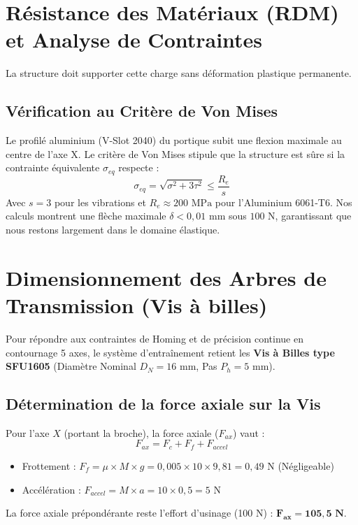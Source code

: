 \section{Résistance des Matériaux (RDM) et Analyse de Contraintes}
La structure doit supporter cette charge sans déformation plastique permanente.

\subsection{Vérification au Critère de Von Mises}
Le profilé aluminium (V-Slot 2040) du portique subit une flexion maximale au centre de l'axe X. Le critère de Von Mises stipule que la structure est sûre si la contrainte équivalente $\sigma_{eq}$ respecte :
\begin{equation}
    \sigma_{eq} = \sqrt{\sigma^2 + 3\tau^2} \leq \frac{R_e}{s}
\end{equation}
Avec $s = 3$ pour les vibrations et $R_e \approx 200 \text{ MPa}$ pour l'Aluminium 6061-T6. Nos calculs montrent une flèche maximale $\delta < 0{,}01 \text{ mm}$ sous $100 \text{ N}$, garantissant que nous restons largement dans le domaine élastique.

\section{Dimensionnement des Arbres de Transmission (Vis à billes)}

Pour répondre aux contraintes de Homing et de précision continue en contournage 5 axes, le système d'entraînement retient les \textbf{Vis à Billes type SFU1605} (Diamètre Nominal $D_N = 16 \text{ mm}$, Pas $P_h = 5 \text{ mm}$). 

\subsection{Détermination de la force axiale sur la Vis}
Pour l'axe $X$ (portant la broche), la force axiale ($F_{ax}$) vaut :
\begin{equation}
    F_{ax} = F_c + F_f + F_{accel}
\end{equation}
\begin{itemize}
    \item Frottement : $F_f = \mu \times M \times g = 0{,}005 \times 10 \times 9{,}81 = 0{,}49 \text{ N}$ (Négligeable)
    \item Accélération : $F_{accel} = M \times a = 10 \times 0{,}5 = 5 \text{ N}$
\end{itemize}
La force axiale prépondérante reste l'effort d'usinage (100 N) : $\mathbf{F_{ax} = 105{,}5 \text{ N}}$.

